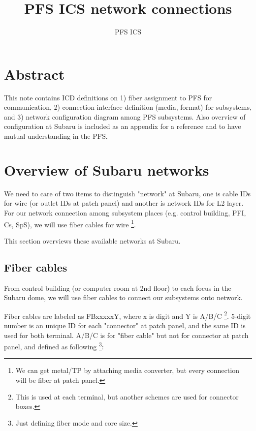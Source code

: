 \documentclass[a4paper,notitlepage]{article}
\title{PFS ICS network connections}
\author{PFS ICS}
\begin{document}
\drafttrue
{}

\ssnhead

\section{Abstract}

This note contains ICD definitions on 
1) fiber assignment to PFS for communication, 
2) connection interface definition (media, format) for subsystems, 
and 3) network configuration diagram among PFS subsystems. 
Also overview of configuration at Subaru is included as an appendix 
for a reference and to have mutual understanding in the PFS. 


\section{Overview of Subaru networks}

We need to care of two items to distinguish "network" at Subaru, one is 
cable IDs for wire (or outlet IDs at patch panel) 
and another is network IDs for L2 layer. 
For our network connection among subsystem places (e.g. control building, 
PFI, Cs, SpS), we will use fiber cables for wire
\footnote{We can get metal/TP by attaching media converter, but every 
connection will be fiber at patch panel.}. 

This section overviews these available networks at Subaru. 

\subsection{Fiber cables}

From control building (or computer room at 2nd floor) to each focus in the 
Subaru dome, we will use fiber cables to connect our subsystems onto network. 

Fiber cables are labeled as FBxxxxxY, where x is digit and Y is A/B/C
\footnote{This is used at each terminal, but another schemes are used for 
connector boxes.}. 
5-digit number is an unique ID for each "connector" at patch panel, and the 
same ID is used for both terminal. 
A/B/C is for "fiber cable" but not for connector at patch panel, 
and defined as following
\footnote{Just defining fiber mode and core size.}: 
\end{document}
